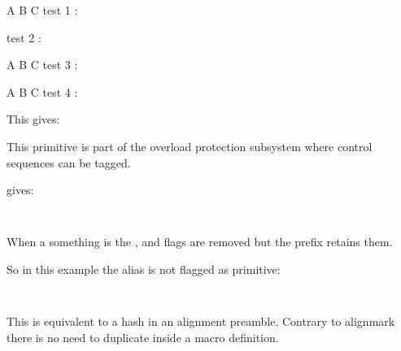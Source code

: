 \startbuffer
{
    \aftergroup A \aftergroup B \aftergroup C
test 1 : }

{
test 2 : }


{
    \aftergroup A 
    \aftergroup B 
    \aftergroup C 
test 3 : }

{
     \aftergroup A
     \aftergroup B
     \aftergroup C
test 4 : }
\stopbuffer

\typebuffer

This gives:

\startpacked\getbuffer\stoppacked

\stopnewprimitive

\startnewprimitive[title={\prm {aliased}}]

This primitive is part of the overload protection subsystem where control sequences
can be tagged.

\startbuffer
\permanent{}
          \let\ofo\foo
\aliased  \let\oof\foo

\meaningasis\foo
\meaningasis\ofo
\meaningasis\oof
\stopbuffer

\typebuffer

gives:

\startlines \tt
\getbuffer
\stoplines

When a something is  the ,  and
 flags are removed but the  prefix retains
them.

\startbuffer
\let\relaxed\relax

\meaningasis\relax
\meaningasis\relaxed
\stopbuffer

\typebuffer

So in this example the \type {\relaxed} alias is not flagged as primitive:

\startlines \tt
\getbuffer
\stoplines

\stopnewprimitive

\startnewprimitive[title={\prm {aligncontent}}]

This is equivalent to a hash in an alignment preamble. Contrary to \prm
{alignmark} there is no need to duplicate inside a macro definition.

\stopnewprimitive

\startnewprimitive[title={\prm {alignmark}}]

